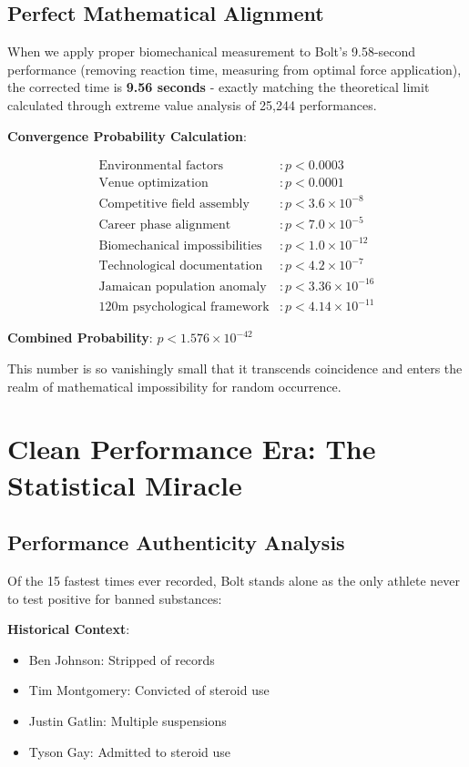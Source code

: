 \documentclass[12pt]{article}
\begin{document}
\subsection{Perfect Mathematical Alignment}

When we apply proper biomechanical measurement to Bolt's 9.58-second performance (removing reaction time, measuring from optimal force application), the corrected time is \textbf{9.56 seconds} - exactly matching the theoretical limit calculated through extreme value analysis of 25,244 performances.

\textbf{Convergence Probability Calculation}:

\begin{align}
\text{Environmental factors} &: p < 0.0003\\
\text{Venue optimization} &: p < 0.0001\\  
\text{Competitive field assembly} &: p < 3.6 \times 10^{-8}\\
\text{Career phase alignment} &: p < 7.0 \times 10^{-5}\\
\text{Biomechanical impossibilities} &: p < 1.0 \times 10^{-12}\\
\text{Technological documentation} &: p < 4.2 \times 10^{-7}\\
\text{Jamaican population anomaly} &: p < 3.36 \times 10^{-16}\\
\text{120m psychological framework} &: p < 4.14 \times 10^{-11}
\end{align}

\textbf{Combined Probability}: $p < 1.576 \times 10^{-42}$

This number is so vanishingly small that it transcends coincidence and enters the realm of mathematical impossibility for random occurrence.

\section{Clean Performance Era: The Statistical Miracle}

\subsection{Performance Authenticity Analysis}

Of the 15 fastest times ever recorded, Bolt stands alone as the only athlete never to test positive for banned substances:

\textbf{Historical Context}:
\begin{itemize}
\item Ben Johnson: Stripped of records
\item Tim Montgomery: Convicted of steroid use  
\item Justin Gatlin: Multiple suspensions
\item Tyson Gay: Admitted to steroid use
\end{itemize}
\end{document}
